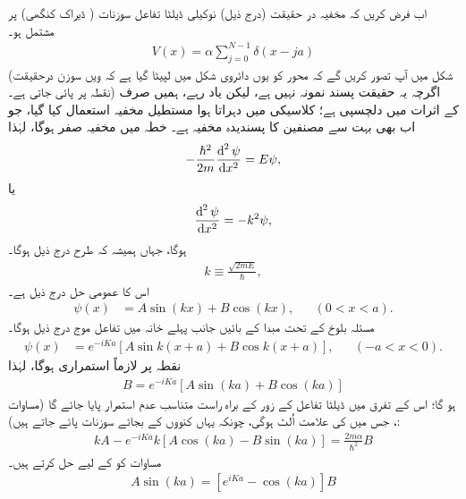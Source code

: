 اب فرض کریں کہ مخفیہ در حقیقت (درج ذیل) نوکیلی ڈیلٹا تفاعل سوزنات ( ڈیراک کنگھی) پر مشتمل ہو۔
\begin{align}\label{مساوات_متماثل_کنگھی}
	V(x) = \alpha\sum_{j=0}^{N-1}\delta(x-ja)
\end{align}
(شکل  میں آپ تصور کریں گے کہ محور  کو یوں دائروی شکل میں لپیٹا گیا ہے کہ ویں سوزن درحقیقت نقطہ  پر پائی جاتی ہے۔) اگرچہ یہ حقیقت پسند نمونہ نہیں ہے، لیکن یاد رہے، ہمیں صرف  کے اثرات میں دلچسپی ہے؛ کلاسیکی  میں دہراتا ہوا مستطیل مخفیہ استعمال کیا گیا، جو اب بھی بہت سے مصنفین کا پسندیدہ مخفیہ ہے۔ خطہ  میں مخفیہ صفر ہوگا، لہٰذا 
\begin{align*}
	-\frac{\hslash^{2}}{2m}\frac{\dif^{\,2}\psi}{\dif x^{2}} = E\psi,
\end{align*}
یا
\begin{align*}
	\frac{\dif^{\,2}\psi}{\dif x^{2}} = -k^{2}\psi,
\end{align*}
ہوگا، جہاں ہمیشہ کہ طرح درج ذیل ہوگا۔
\begin{align}
	k \equiv \frac{\sqrt{2mE}}{\hslash},
\end{align}
اس کا عمومی حل درج ذیل ہے۔
\begin{align}\label{مساوات_متماثل_عمومی_حل_بلوخ_الف}
	\psi(x) &= A\sin(kx) + B\cos(kx), &&(0<x<a).
\end{align}
مسئلہ بلوخ کے تحت مبدا کے بائیں جانب پہلے خانہ میں تفاعل موج درج ذیل ہوگا۔ 
\begin{align}\label{مساوات_متماثل_عمومی_حل_بلوخ_ب}
	\psi(x) &= e^{-iKa}[A\sin k(x+a) + B\cos k(x+a)], &&(-a<x<0). 
\end{align}
نقطہ پر  لازماً استمراری ہوگا، لہٰذا 
\begin{align}\label{مساوات_متماثل_استمراری_بلوخ}
	B = e^{-iKa}[A\sin(ka) + B\cos(ka)]
\end{align}
ہو گا؛ اس کے تفرق میں ڈیلٹا تفاعل کے زور کے براہ راست متناسب عدم استمرار پایا جائے گا (مساوات ، جس میں  کی علامت اُلٹ ہوگی، چونکہ یہاں کنووں کے بجائے سوزنات پائے جاتے ہیں):
\begin{align}\label{مساوات_متماثل_عدم_استمرار_بلوخ}
	kA - e^{-iKa}k[A\cos(ka) - B\sin(ka)] = \frac{2m\alpha}{\hslash^{2}}B
\end{align}
مساوات  کو  کے لیے حل کرتے ہیں۔
\begin{align}\label{مساوات_متماثل_عمومی_حل_بلوخ_پ}
	A\sin(ka) = [e^{iKa}-\cos(ka)]B
\end{align}
